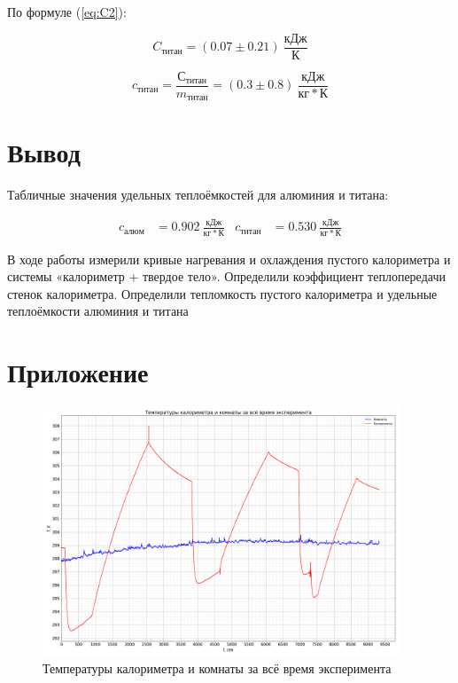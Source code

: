\documentclass[a4paper, 12pt]{article}
\begin{document}
                По формуле (\ref{eq:C2}):

                \begin{equation*}
                    C_{титан} = (0.07 \pm 0.21)~\frac{кДж}{К}
                \end{equation*}

                \begin{equation*}
                    c_{титан} = \frac{С_{титан}}{m_{титан}} = (0.3 \pm 0.8)~\frac{кДж}{кг*К}
                \end{equation*}

    \section{Вывод}

        Табличные значения удельных теплоёмкостей для алюминия и титана:

        \begin{align*}
            c_{алюм} &= 0.902~\frac{кДж}{кг*К} & c_{титан} &= 0.530~\frac{кДж}{кг*К}
        \end{align*}

        В ходе работы измерили кривые нагревания и охлаждения пустого калориметра и системы «калориметр + твердое тело». Определили коэффициент теплопередачи стенок калориметра. Определили тепломкость пустого калориметра и удельные теплоёмкости алюминия и титана

    \section{Приложение}

        \begin{figure}[!ht]
            \centering
            \includegraphics[angle=90,width=0.95\textwidth]{"img/graph_all.png"}
            \caption{Температуры калориметра и комнаты за всё время эксперимента}
            \label{plot:all}
        \end{figure}
\end{document}
